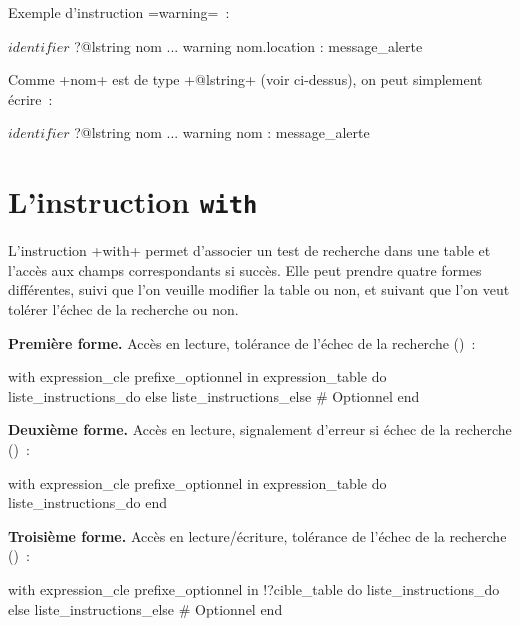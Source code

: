 Exemple d'instruction \ggs=warning=~:

\begin{galgas}
$identifier$ ?@lstring nom
...
warning nom.location : message_alerte
\end{galgas}

Comme \ggs+nom+ est de type \ggs+@lstring+ (voir ci-dessus), on peut simplement écrire~:
\begin{galgas}
$identifier$ ?@lstring nom
...
warning nom : message_alerte
\end{galgas}










\section{L'instruction \texttt{with}}

L'instruction \ggs+with+ permet d'associer un test de recherche dans une table et l'accès aux champs correspondants si succès. Elle peut prendre quatre formes différentes, suivi que l'on veuille modifier la table ou non, et suivant que l'on veut tolérer l'échec de la recherche ou non.

\textbf{Première forme.} Accès en lecture, tolérance de l'échec de la recherche ()~:
\begin{galgas}
with expression_cle prefixe_optionnel in expression_table
do
  liste_instructions_do
else
  liste_instructions_else # Optionnel
end
\end{galgas}

\textbf{Deuxième forme.} Accès en lecture, signalement d'erreur si échec de la recherche ()~:
\begin{galgas}
with expression_cle prefixe_optionnel in expression_table
do
  liste_instructions_do
end
\end{galgas}



\textbf{Troisième forme.} Accès en lecture/écriture, tolérance de l'échec de la recherche ()~:
\begin{galgas}
with expression_cle prefixe_optionnel in !?cible_table
do
  liste_instructions_do
else
  liste_instructions_else # Optionnel
end
\end{galgas}

